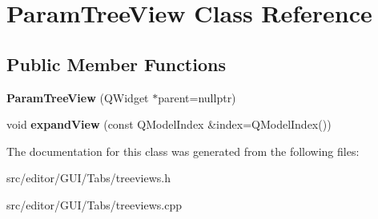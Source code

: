 \hypertarget{class_param_tree_view}{\section{\-Param\-Tree\-View \-Class \-Reference}
\label{class_param_tree_view}
}
\subsection*{\-Public \-Member \-Functions}
\begin{DoxyCompactItemize}
\item 
\hypertarget{class_param_tree_view_ab4b0181a3106a05e567433c88ef46cb7}{{\bfseries \-Param\-Tree\-View} (\-Q\-Widget $\ast$parent=nullptr)}\label{class_param_tree_view_ab4b0181a3106a05e567433c88ef46cb7}

\item 
\hypertarget{class_param_tree_view_a6afd2dc7a3d5e714c516515d26443762}{void {\bfseries expand\-View} (const \-Q\-Model\-Index \&index=\-Q\-Model\-Index())}\label{class_param_tree_view_a6afd2dc7a3d5e714c516515d26443762}

\end{DoxyCompactItemize}


\-The documentation for this class was generated from the following files\-:\begin{DoxyCompactItemize}
\item 
src/editor/\-G\-U\-I/\-Tabs/treeviews.\-h\item 
src/editor/\-G\-U\-I/\-Tabs/treeviews.\-cpp\end{DoxyCompactItemize}
